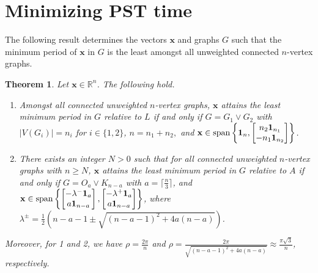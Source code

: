 \documentclass[11pt]{article}
\newtheorem{theorem}{Theorem}
\newcommand{\ones}{{\bf{1}}}
\newcommand{\bx}{\mathbf x}
\def\R{\mathbb{R}}
\begin{document}
\section{Minimizing PST time}\label{Sec:minpst}

The following result determines the vectors $\bx$ and graphs $G$ such that the minimum period of $\bx$ in $G$ is the least amongst all unweighted connected $n$-vertex graphs.

\begin{theorem}
\label{Thm:minperjoin}
Let $\bx\in \R^n$. The following hold.
\begin{enumerate}
\item Amongst all connected unweighted $n$-vertex graphs, $\bx$ attains the least minimum period in $G$ relative to $L$ if and only if $G=G_1\vee G_2$ with $|V(G_i)|=n_i$ for $i\in\{1,2\}$, $n=n_1+n_2,$ and $\bx\in\operatorname{span}\left\{\ones_n,\begin{bmatrix}
n_2\ones_{n_1} \\ -n_1\ones_{n_2}
\end{bmatrix}\right\}$.
\item There exists an integer $N>0$ such that for all connected unweighted $n$-vertex graphs with $n\geq N$, $\bx$ attains the least minimum period in $G$ relative to $A$ if and only if $G=O_a\vee K_{n-a}$  with $a=\lceil\frac{n}{3}\rceil$, and $\bx\in\operatorname{span}\left\{\begin{bmatrix}
-\lambda^-\ones_{a} \\ a\ones_{n-a}
\end{bmatrix},\begin{bmatrix}
-\lambda^+\ones_{a} \\ a\ones_{n-a}
\end{bmatrix}\right\}$, where $\lambda^{\pm}=\frac{1}{2}(n-a-1\pm \sqrt{(n-a-1)^2+4a(n-a)})$.
\end{enumerate}
Moreover, for 1 and 2, we have $\rho=\frac{2\pi}{n}$ and $\rho=\frac{2\pi}{\sqrt{(n-a-1)^2+4a(n-a)}}\approx\frac{\pi\sqrt{3}}{n}$, respectively.
\end{theorem}
\end{document}
